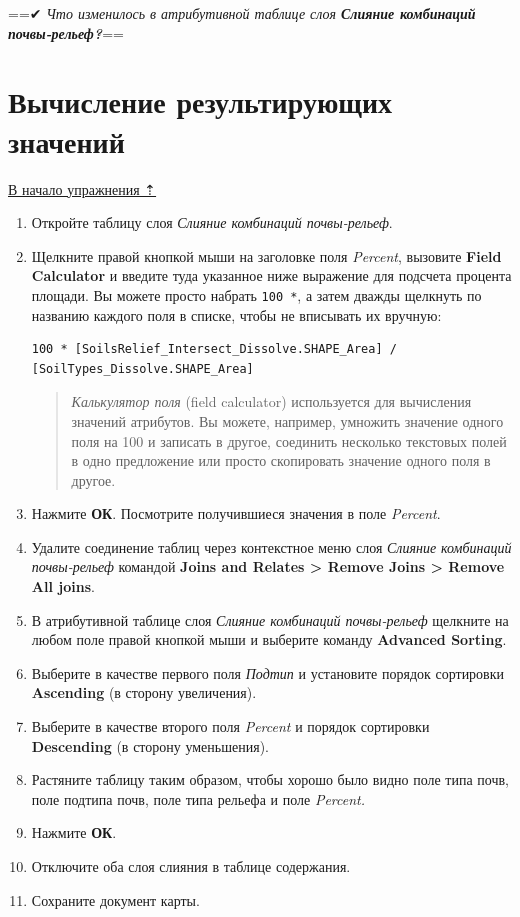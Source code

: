 \documentclass[]{book}
\theoremstyle{definition}
\theoremstyle{definition}
\theoremstyle{definition}
\theoremstyle{remark}
\begin{document}
==✔︎ \emph{Что изменилось в атрибутивной таблице слоя \textbf{Слияние
комбинаций почвы-рельеф?}}==

\hypertarget{overlay-resulting}{%
\section{Вычисление результирующих значений}\label{overlay-resulting}}

\protect\hyperlink{overlay}{В начало упражнения ⇡}

\begin{enumerate}
\def\labelenumi{\arabic{enumi}.}
\item
  Откройте таблицу слоя \emph{Слияние комбинаций почвы-рельеф}.
\item
  Щелкните правой кнопкой мыши на заголовке поля \emph{Percent},
  вызовите \textbf{Field Calculator} и введите туда указанное ниже
  выражение для подсчета процента площади. Вы можете просто набрать
  \texttt{100\ *}, а затем дважды щелкнуть по названию каждого поля в
  списке, чтобы не вписывать их вручную:

\begin{verbatim}
100 * [SoilsRelief_Intersect_Dissolve.SHAPE_Area] /
[SoilTypes_Dissolve.SHAPE_Area]
\end{verbatim}

  \begin{quote}
  \emph{Калькулятор поля} (field calculator) используется для вычисления
  значений атрибутов. Вы можете, например, умножить значение одного поля
  на 100 и записать в другое, соединить несколько текстовых полей в одно
  предложение или просто скопировать значение одного поля в другое.
  \end{quote}
\item
  Нажмите \textbf{ОК}. Посмотрите получившиеся значения в поле
  \emph{Percent}.
\item
  Удалите соединение таблиц через контекстное меню слоя \emph{Слияние
  комбинаций почвы-рельеф} командой \textbf{Joins and Relates
  \textgreater{} Remove Joins \textgreater{} Remove All joins}.
\item
  В атрибутивной таблице слоя \emph{Слияние комбинаций почвы-рельеф}
  щелкните на любом поле правой кнопкой мыши и выберите команду
  \textbf{Advanced Sorting}.
\item
  Выберите в качестве первого поля \emph{Подтип} и установите порядок
  сортировки \textbf{Ascending} (в сторону увеличения).
\item
  Выберите в качестве второго поля \emph{Percent} и порядок сортировки
  \textbf{Descending} (в сторону уменьшения).
\item
  Растяните таблицу таким образом, чтобы хорошо было видно поле типа
  почв, поле подтипа почв, поле типа рельефа и поле \emph{Percent.}
\item
  Нажмите \textbf{ОК}.
\item
  Отключите оба слоя слияния в таблице содержания.
\item
  Сохраните документ карты.


\end{enumerate}
\end{document}
